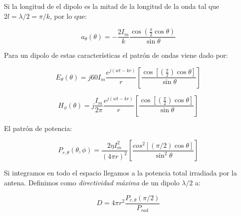 \documentclass[12pt,a4paper]{article}
\newcommand{\parentesis}[1]{\left( #1  \right)}
\newcommand{\ccorchetes}[1]{\left[ #1  \right]}
\begin{document}
Si la longitud de el dipolo es la mitad de la longitud de la onda tal que $2l = \lambda / 2  = \pi/k$, por lo que:

\begin{equation}
a_{\theta} (\theta) = - \dfrac{2 I_m}{k} \dfrac{\cos (\frac{\pi}{2} \cos \theta)}{\sin \theta}
\end{equation}
 
Para un dipolo de estas características el patrón de ondas viene dado por:

\begin{equation}
E_\theta (\theta) = j 60 I_m \dfrac{e^{j(wt-kr)}}{r} \ccorchetes{\dfrac{\cos \ccorchetes{\parentesis{\frac{\pi}{2}} \cos \theta}}{\sin \theta}}
\end{equation}

\begin{equation}
H_\phi (\theta) = j  \dfrac{I_m}{2 \pi} \dfrac{e^{j(wt-kr)}}{r} \ccorchetes{\dfrac{\cos \ccorchetes{\parentesis{\frac{\pi}{2}} \cos \theta}}{\sin \theta}}
\end{equation}

El patrón de potencia:


\begin{equation}
P_{r,\theta} (\theta,\phi) = \dfrac{2 \eta I_m^2}{(4 \pi r)^2} \ccorchetes{\dfrac{cos^2 \ccorchetes{\parentesis{\pi/2} \cos \theta}}{\sin^2 \theta}}
\end{equation}
 
Si integramos en todo el espacio llegamos a la potencia total irradiada por la antena. Definimos como \textit{directividad máxima} de un dipolo $\lambda/2$ a:

\begin{equation}
D = 4 \pi r^2 \dfrac{P_{r,\theta} (\pi/2)}{P_{rad}}
\end{equation} 
 
 
\end{document}
